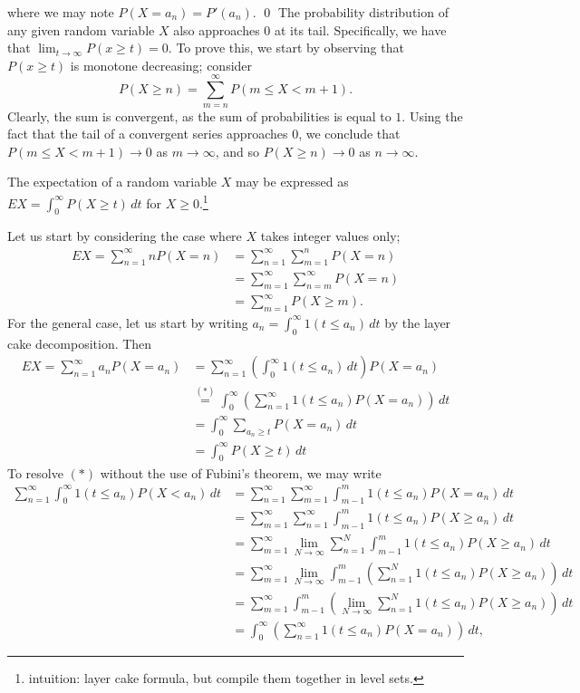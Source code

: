 where we may note $P(X = a_n) = P'(a_n)$. \qed
\medskip\newline
\noindent The probability distribution of any given random variable $X$ also approaches $0$ at its tail. Specifically, we have that $\lim_{t \to \infty} P(x \geq t) = 0$. To prove this, we start by observing that $P(x \geq t)$ is monotone decreasing; consider
\[ P(X \geq n) = \sum_{m = n}^\infty P(m \leq X < m+1). \]
Clearly, the sum is convergent, as the sum of probabilities is equal to $1$. Using the fact that the tail of a convergent series approaches $0$, we conclude that $P(m \leq X < m + 1) \to 0$ as $m \to \infty$, and so $P(X \geq n) \to 0$ as $n \to \infty$.

\newpage
\begin{simplelemma}
    The expectation of a random variable $X$ may be expressed as $EX = \int_0^\infty P(X \geq t) \, dt$ for $X \geq 0$.\footnote{intuition: layer cake formula, but compile them together in level sets.}
\end{simplelemma}
\noindent Let us start by considering the case where $X$ takes integer values only;
\begin{align*}
    EX = \sum_{n=1}^\infty n P(X = n) &= \sum_{n=1}^\infty \sum_{m=1}^n P(X = n) \\
    &= \sum_{m=1}^\infty \sum_{n=m}^\infty P(X = n) \\
    &= \sum_{m=1}^\infty P(X \geq m).
\end{align*}
For the general case, let us start by writing $a_n = \int_0^\infty 1(t \leq a_n) \, dt$ by the layer cake decomposition. Then
\begin{align*}
    EX = \sum_{n=1}^\infty a_n P(X = a_n) &= \sum_{n=1}^\infty \left(\int_0^\infty 1(t \leq a_n) \, dt\right) P(X = a_n) \\
    &\stackrel{(\ast)}{=} \int_0^\infty \left(\sum_{n=1}^\infty 1(t \leq a_n) P(X = a_n)\right) \, dt \tag{Fubini} \\
    &= \int_0^\infty \sum_{a_n \geq t} P(X = a_n) \, dt \\
    &= \int_0^\infty P(X \geq t) \, dt
\end{align*}
To resolve $(\ast)$ without the use of Fubini's theorem, we may write
\begin{align*}
    \sum_{n=1}^\infty \int_0^\infty 1(t \leq a_n) P(X < a_n) \, dt &= \sum_{n=1}^\infty \sum_{m=1}^\infty \int_{m-1}^m 1(t \leq a_n) P(X = a_n) \, dt \\
    &= \sum_{m=1}^\infty \sum_{n=1}^\infty \int_{m-1}^m 1(t \leq a_n) P(X \geq a_n) \, dt \\
    &= \sum_{m=1}^\infty \lim_{N \to \infty} \sum_{n=1}^N \int_{m-1}^m 1(t \leq a_n) P(X \geq a_n) \, dt \\
    &= \sum_{m=1}^\infty \lim_{N \to \infty} \int_{m-1}^m \left( \sum_{n=1}^N 1(t \leq a_n) P(X \geq a_n) \right) \, dt \\
    &= \sum_{m=1}^\infty \int_{m-1}^m \left( \lim_{N \to \infty} \sum_{n=1}^N 1(t \leq a_n) P(X \geq a_n) \right) \, dt \\
    &= \int_0^\infty \left(\sum_{n=1}^\infty 1(t \leq a_n) P(X = a_n)\right) \, dt,
\end{align*}
